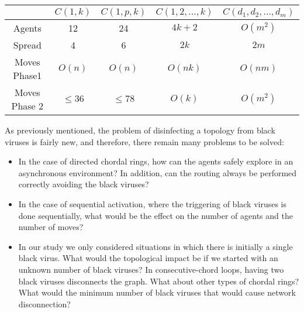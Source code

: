 \begin{center}
\begin{tabular}{|c|c|c|c|c|}\hline
        &{\bf $C(1,  k)$} &{\bf $C(1, p, k)$} & {\bf $C(1,2,\ldots,k)$}& {\bf $C(d_1,d_2,\ldots,d_m)$}
\\ \hline 
Agents & 12  & 24 & $4k+2$ &   $O(m^2)$  \\\hline
Spread & 4   & 6 &  $2k$ & $2m$  \\\hline
Moves Phase1 &$O(n)$ & $O(n)$ &  $O(nk) $ &  $O(nm) $  \\\hline
Moves Phase 2 & $\leq 36$   &     $\leq 78$  &  $O(k)$& $O(m^2)$ 
 \\\hline
\end{tabular}
\end{center}




As  previously mentioned, the problem of disinfecting a topology from black viruses is fairly new, and therefore, there remain many problems to be solved:
\begin{itemize}
\item In the case of   directed chordal rings, how can  the agents safely explore   in an asynchronous environment? In addition,  can  the routing always be performed correctly avoiding the black viruses?
\item In the case of  sequential activation, where the triggering of black viruses is done sequentially, what would be the effect on the number of agents and the number of moves?

\item In our study we only considered situations in which there is initially a single black virus. What would the topological impact be if we started with an unknown number of black viruses? In consecutive-chord loops, having two black viruses disconnects the graph. What about other types of chordal rings? What would the minimum number of black viruses that would cause network disconnection?

\end{itemize}













